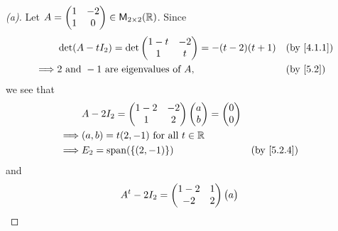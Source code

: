 \begin{proof}[(a)]
  Let \(A = \begin{pmatrix}
    1 & -2 \\
    1 & 0
  \end{pmatrix} \in \ms[2][2][\R]\).
  Since
  \begin{align*}
             & \det(A - t I_2) = \det\begin{pmatrix}
                                       1 - t & -2 \\
                                       1     & t
                                     \end{pmatrix} = -(t - 2)(t + 1)            &  & \by{4.1.1} \\
    \implies & 2 \text{ and } -1 \text{ are eigenvalues of } A, &  & \by{5.2}
  \end{align*}
  we see that
  \begin{align*}
             & A - 2I_2 = \begin{pmatrix}
                            1 - 2 & -2 \\
                            1     & 2
                          \end{pmatrix} \begin{pmatrix}
                                          a \\
                                          b
                                        \end{pmatrix} = \begin{pmatrix}
                                                          0 \\
                                                          0
                                                        \end{pmatrix}     \\
    \implies & (a, b) = t(2, -1) \text{ for all } t \in \R                 \\
    \implies & E_2 = \spn{\set{(2, -1)}}                   &  & \by{5.2.4}
  \end{align*}
  and
  \begin{align*}
             & {A}^{t} - 2I_2 = \begin{pmatrix}
                                 1 - 2 & 1 \\
                                 -2    & 2
                               \end{pmatrix} \begin{pmatrix}
                                               a \\

\end{pmatrix}
\end{align*}
\end{proof}
